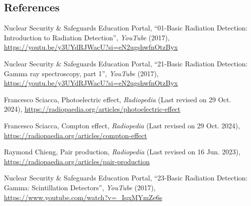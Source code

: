 \documentclass[12pt]{article}
\begin{document}
\newpage

\subsection*{References}
\begin{enumerate}[label={[\arabic*]}]
    \item \label{sec:1} Nuclear Security \& Safeguards Education Portal, ``01-Basic Radiation Detection: Introduction to Radiation Detection'', \textit{YouTube} (2017), \url{https://youtu.be/y3UYdRJWacU?si=eN2ugshwfnOtzByx}
    \item \label{sec:2} Nuclear Security \& Safeguards Education Portal, ``21-Basic Radiation Detection: Gamma ray spectroscopy, part 1'', \textit{YouTube} (2017), \url{https://youtu.be/y3UYdRJWacU?si=eN2ugshwfnOtzByx}
    \item \label{sec:3} Francesco Sciacca, Photoelectric effect, \textit{Radiopedia} (Last revised on 29 Oct. 2024), \url{https://radiopaedia.org/articles/photoelectric-effect}
    \item \label{sec:4} Francesco Sciacca, Compton effect, \textit{Radiopedia} (Last revised on 29 Oct. 2024), \url{https://radiopaedia.org/articles/compton-effect}
    \item \label{sec:5} Raymond Chieng, Pair production, \textit{Radiopedia} (Last revised on 16 Jun. 2023), \url{https://radiopaedia.org/articles/pair-production}
    \item \label{sec:6} Nuclear Security \& Safeguards Education Portal, ``23-Basic Radiation Detection: Gamma: Scintillation Detectors'', \textit{YouTube} (2017), \url{https://www.youtube.com/watch?v=_IqxMYmZe6s}
\end{enumerate}

\newpage
\end{document}
